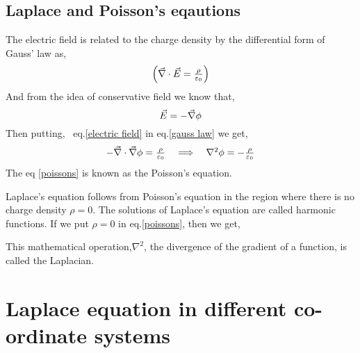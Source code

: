\subsection{Laplace and Poisson's eqautions}
The electric field is related to the charge density by the  differential form of Gauss' law as,
\begin{equation}
$$\left(\vec{\nabla} \cdot \vec{E}=\frac{\rho}{\varepsilon_{0}}\right)$$\label{gauss law}
\end{equation}
And from the idea of conservative field we know that,\begin{equation}
$$\vec{E}=-\vec{\nabla} \phi\label{electric field}$$
\end{equation} 
Then putting, \ eq.\ref{electric field} in eq.\ref{gauss law} we get,
\begin{equation}
$$-\vec{\nabla} \cdot \vec{\nabla} \phi=\frac{\rho}{\varepsilon_{0}}\quad \Longrightarrow \quad \nabla^{2} \phi=-\frac{\rho}{\varepsilon_{0}}\label{poissons} $$
\end{equation}
The eq \ref{poissons} is known as the Poisson's equation. 

\begin{center}
\end{center}
Laplace's equation follows from Poisson's equation in the region where there is no charge density $\rho=0 .$ The solutions of Laplace's equation are called harmonic functions. If we put $\rho=0$ in eq.\ref{poissons},  then we get,
\begin{center}
\end{center}
\begin{note}
This mathematical operation,$ \nabla^{2}$, the divergence of the gradient of a function, is called the Laplacian.
\end{note}
\section{Laplace equation in different co-ordinate systems}
